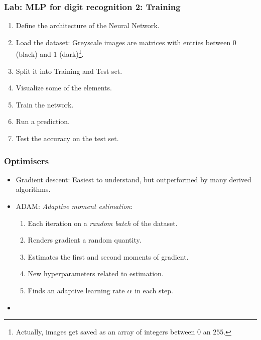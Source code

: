 \documentclass[10pt,hyperref={pdfpagelabels=false}]{beamer}
\begin{document}
\begin{frame}
    \frametitle{Lab: MLP for digit recognition 2: Training}
        \begin{enumerate}
            \item Define the architecture of the Neural Network.
            \item Load the dataset: Greyscale images are matrices with entries between $0$ (black) and $1$ (dark)\footnote{Actually, images get saved as an array of integers between $0$ an $255$.}.
            \item Split it into Training and Test set.
            \item Visualize some of the elements.
            \item Train the network.
            \item Run a prediction.
            \item Test the accuracy on the test set.
        \end{enumerate}
\end{frame}
\begin{frame}
    \frametitle{Optimisers}
        \begin{itemize}
            \item Gradient descent: Easiest to understand, but outperformed by many derived algorithms.
            \item ADAM: \emph{Adaptive moment estimation}:\\
                \begin{enumerate}
                    \item Each iteration on a \emph{random batch} of the dataset.
                    \item Renders gradient a random quantity.
                    \item Estimates the first and second moments of gradient.
                    \item New hyperparameters related to estimation.
                    \item Finds an adaptive learning rate $\alpha$ in each step.
                \end{enumerate}
            \item
        \end{itemize}
\end{frame}
\end{document}
